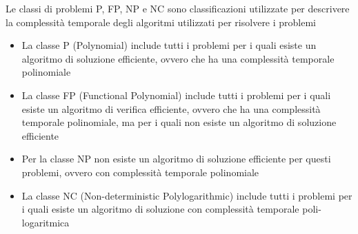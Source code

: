 Le classi di problemi P, FP, NP e NC sono classificazioni utilizzate per descrivere la complessità temporale degli algoritmi utilizzati per risolvere i problemi
\begin{itemize}
    \item La classe P (Polynomial) include tutti i problemi per i quali esiste un algoritmo di soluzione efficiente, ovvero che ha una complessità temporale polinomiale
    \item La classe FP (Functional Polynomial) include tutti i problemi per i quali esiste un algoritmo di verifica efficiente, ovvero che ha una complessità temporale polinomiale, ma per i quali non esiste un algoritmo di soluzione efficiente
    \item Per la classe NP non esiste un algoritmo di soluzione efficiente per questi problemi, ovvero con complessità temporale polinomiale  
    \item La classe NC (Non-deterministic Polylogarithmic) include tutti i problemi per i quali esiste un algoritmo di soluzione con complessità temporale poli-logaritmica
\end{itemize}



\newpage